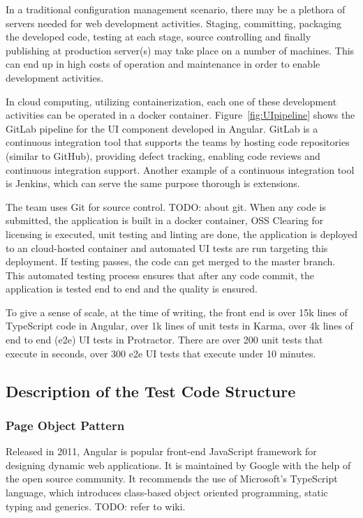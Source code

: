\documentclass[conference]{IEEEtran}
\newcommand{\todo}[1]{}
\renewcommand{\todo}[1]{{\color{red} TODO: {#1}}}
\begin{document}
	In a traditional configuration management scenario, there may be a plethora of servers needed for web development activities.
	Staging, committing, packaging the developed code, testing at each stage, source controlling and finally publishing at production server(s) may take place on a number of machines.
	This can end up in high costs of operation and maintenance in order to enable development activities.
	
	In cloud computing, utilizing containerization, each one of these development activities can be operated in a docker container.
	Figure~\ref{fig:UIpipeline} shows the GitLab pipeline for the UI component developed in Angular.
	GitLab is a continuous integration tool that supports the teams by hosting code repositories (similar to GitHub), providing defect tracking, enabling code reviews and continuous integration support. 
	Another example of a continuous integration tool is Jenkins, which can serve the same purpose thorough is extensions.


	The team uses Git for source control. \todo{about git}. 
	When any code is submitted, the application is built in a docker container, OSS Clearing for licensing is executed, unit testing and linting are done, the application is deployed to an cloud-hosted container and automated UI tests are run targeting this deployment.
	If testing passes, the code can get merged to the master branch. 
	This automated testing process ensures that after any code commit, the application is tested end to end and the quality is ensured. 
	
	To give a sense of scale, at the time of writing, the front end is over 15k lines of TypeScript code in Angular, over 1k lines of unit tests in Karma, over 4k lines of end to end (e2e) UI tests in Protractor. 
	There are over 200 unit tests that execute in seconds, over 300 e2e UI tests that execute under 10 minutes. 



\subsection{Description of the Test Code Structure}

	\subsubsection{Page Object Pattern}

	Released in 2011, Angular is popular front-end JavaScript framework for designing dynamic web applications.
	It is maintained by Google with the help of the open source community.
	It recommends the use of Microsoft's TypeScript language, which introduces class-based object oriented programming, static typing and generics. \todo{refer to wiki}.
\end{document}
